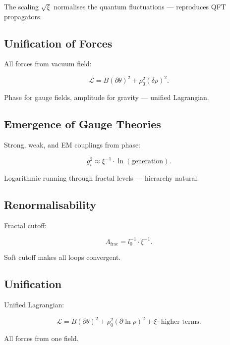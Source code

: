 	The scaling \(\sqrt{\xi}\) normalises the quantum fluctuations — reproduces QFT propagators.
	
	\subsection*{Unification of Forces}
	
	All forces from vacuum field:
	
	\begin{equation}
		\mathcal{L} = B (\partial \theta)^2 + \rho_0^2 (\delta \rho)^2.
	\end{equation}
	
	Phase for gauge fields, amplitude for gravity — unified Lagrangian.
	
	\subsection*{Emergence of Gauge Theories}
	
	Strong, weak, and EM couplings from phase:
	
	\begin{equation}
		g_i^2 \approx \xi^{-1} \cdot \ln(\text{generation}).
	\end{equation}
	
	Logarithmic running through fractal levels — hierarchy natural.
	
	\subsection*{Renormalisability}
	
	Fractal cutoff:
	
	\begin{equation}
		\Lambda_{\text{frac}} = l_0^{-1} \cdot \xi^{-1}.
	\end{equation}
	
	Soft cutoff makes all loops convergent.
	
	\subsection*{Unification}
	
	Unified Lagrangian:
	
	\begin{equation}
		\mathcal{L} = B (\partial \theta)^2 + \rho_0^2 (\partial \ln \rho)^2 + \xi \cdot \text{higher terms}.
	\end{equation}
	
	All forces from one field.
	
